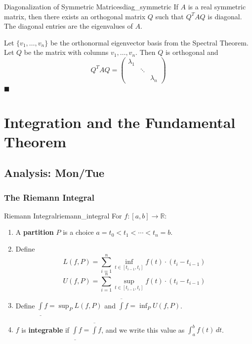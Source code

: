 \documentclass[11pt, letterpaper, openany]{book}
\renewenvironment{proof}[1][\proofname]{%
  \tcolorbox[blanker, breakable, left=1em,
    before skip=1em, after skip=1em,
    borderline west={2pt}{0pt}{MagicTeal!50},
    colback=MagicCream,
    before upper={\textcolor{MagicTeal}{\sffamily\bfseries #1.}\space}
  ]%
}{%
  \hfill\textcolor{MagicTeal}{\ensuremath{\blacksquare}}\endtcolorbox%
}
\begin{document}
\begin{cor}{Diagonalization of Symmetric Matrices}{diag_symmetric}
If $A$ is a real symmetric matrix, then there exists an orthogonal matrix $Q$ such that $Q^T A Q$ is diagonal. The diagonal entries are the eigenvalues of $A$.
\end{cor}

\begin{proof}
Let $\{v_1, \ldots, v_n\}$ be the orthonormal eigenvector basis from the Spectral Theorem. Let $Q$ be the matrix with columns $v_1, \ldots, v_n$. Then $Q$ is orthogonal and
\[Q^T A Q = \begin{pmatrix} \lambda_1 & & \\ & \ddots & \\ & & \lambda_n \end{pmatrix}\]
\end{proof}


\chapter{Integration and the Fundamental Theorem}

\section{Analysis: Mon/Tue}

\subsection{The Riemann Integral}

\begin{defn}{Riemann Integral}{riemann_integral}
For $f: [a,b] \to \mathbb{R}$:
\begin{enumerate}
    \item A \textbf{partition} $P$ is a choice $a = t_0 < t_1 < \cdots < t_n = b$.
    \item Define
    \[L(f, P) = \sum_{i=1}^n \inf_{t \in [t_{i-1}, t_i]} f(t) \cdot (t_i - t_{i-1})\]
    \[U(f, P) = \sum_{i=1}^n \sup_{t \in [t_{i-1}, t_i]} f(t) \cdot (t_i - t_{i-1})\]
    \item Define $\underline{\int} f = \sup_P L(f,P)$ and $\overline{\int} f = \inf_P U(f,P)$.
    \item $f$ is \textbf{integrable} if $\underline{\int} f = \overline{\int} f$, and we write this value as $\int_a^b f(t) \, dt$.
\end{enumerate}
\end{defn}
\end{document}
